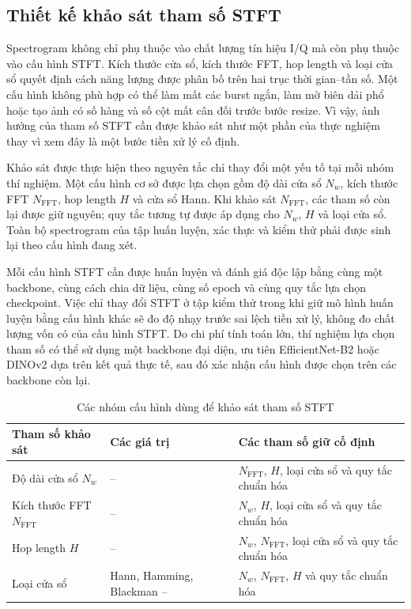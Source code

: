 \documentclass[../DoAn.tex]{subfiles}
\begin{document}
\subsection{Thiết kế khảo sát tham số STFT}

Spectrogram không chỉ phụ thuộc vào chất lượng tín hiệu I/Q mà còn phụ thuộc vào cấu hình STFT. Kích thước cửa sổ, kích thước FFT, hop length và loại cửa sổ quyết định cách năng lượng được phân bố trên hai trục thời gian--tần số. Một cấu hình không phù hợp có thể làm mất các burst ngắn, làm mờ biên dải phổ hoặc tạo ảnh có số hàng và số cột mất cân đối trước bước resize. Vì vậy, ảnh hưởng của tham số STFT cần được khảo sát như một phần của thực nghiệm thay vì xem đây là một bước tiền xử lý cố định.

Khảo sát được thực hiện theo nguyên tắc chỉ thay đổi một yếu tố tại mỗi nhóm thí nghiệm. Một cấu hình cơ sở được lựa chọn gồm độ dài cửa sổ $N_w$, kích thước FFT $N_{\mathrm{FFT}}$, hop length $H$ và cửa sổ Hann. Khi khảo sát $N_{\mathrm{FFT}}$, các tham số còn lại được giữ nguyên; quy tắc tương tự được áp dụng cho $N_w$, $H$ và loại cửa sổ. Toàn bộ spectrogram của tập huấn luyện, xác thực và kiểm thử phải được sinh lại theo cấu hình đang xét.

Mỗi cấu hình STFT cần được huấn luyện và đánh giá độc lập bằng cùng một backbone, cùng cách chia dữ liệu, cùng số epoch và cùng quy tắc lựa chọn checkpoint. Việc chỉ thay đổi STFT ở tập kiểm thử trong khi giữ mô hình huấn luyện bằng cấu hình khác sẽ đo độ nhạy trước sai lệch tiền xử lý, không đo chất lượng vốn có của cấu hình STFT. Do chi phí tính toán lớn, thí nghiệm lựa chọn tham số có thể sử dụng một backbone đại diện, ưu tiên EfficientNet-B2 hoặc DINOv2 dựa trên kết quả thực tế, sau đó xác nhận cấu hình được chọn trên các backbone còn lại.

\begin{table}[H]
    \centering
    \caption{Các nhóm cấu hình dùng để khảo sát tham số STFT}
    \label{tab:stft_experiment_design}
    \renewcommand{\arraystretch}{1.3}
    \begin{tabular}{|p{}|p{}|p{}|}
        \hline
        \textbf{Tham số khảo sát} & \textbf{Các giá trị} & \textbf{Các tham số giữ cố định} \\ \hline
        Độ dài cửa sổ $N_w$ & -- & $N_{\mathrm{FFT}}$, $H$, loại cửa sổ và quy tắc chuẩn hóa \\ \hline
        Kích thước FFT $N_{\mathrm{FFT}}$ & -- & $N_w$, $H$, loại cửa sổ và quy tắc chuẩn hóa \\ \hline
        Hop length $H$ & -- & $N_w$, $N_{\mathrm{FFT}}$, loại cửa sổ và quy tắc chuẩn hóa \\ \hline
        Loại cửa sổ & Hann, Hamming, Blackman -- & $N_w$, $N_{\mathrm{FFT}}$, $H$ và quy tắc chuẩn hóa \\ \hline
    \end{tabular}
\end{table}
\end{document}

